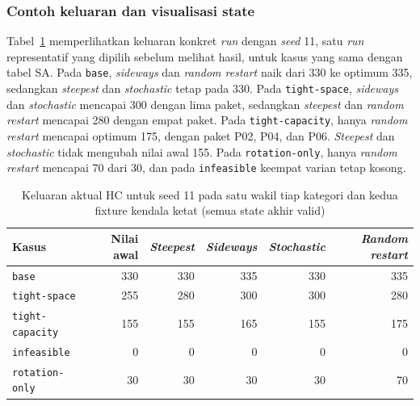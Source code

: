 \subsubsection{Contoh keluaran dan visualisasi state}

Tabel~\ref{tab:hc-representative} memperlihatkan keluaran konkret \textit{run} dengan \textit{seed} 11, satu \textit{run} representatif yang dipilih sebelum melihat hasil, untuk kasus yang sama dengan tabel SA. Pada \texttt{base}, \textit{sideways} dan \textit{random restart} naik dari 330 ke optimum 335, sedangkan \textit{steepest} dan \textit{stochastic} tetap pada 330. Pada \texttt{tight-space}, \textit{sideways} dan \textit{stochastic} mencapai 300 dengan lima paket, sedangkan \textit{steepest} dan \textit{random restart} mencapai 280 dengan empat paket. Pada \texttt{tight-capacity}, hanya \textit{random restart} mencapai optimum 175, dengan paket P02, P04, dan P06. \textit{Steepest} dan \textit{stochastic} tidak mengubah nilai awal 155. Pada \texttt{rotation-only}, hanya \textit{random restart} mencapai 70 dari 30, dan pada \texttt{infeasible} keempat varian tetap kosong.

\begin{table}[H]
    \centering
    \small
    \caption{Keluaran aktual HC untuk seed 11 pada satu wakil tiap kategori dan kedua fixture kendala ketat (semua state akhir valid)}
    \label{tab:hc-representative}
    \begin{tabular}{@{}lrrrrr@{}}
        \toprule
        Kasus                   & Nilai awal & \textit{Steepest} & \textit{Sideways} & \textit{Stochastic} & \textit{Random restart} \\
        \midrule
        \texttt{base}           & 330        & 330               & 335               & 330                 & 335                     \\
        \texttt{tight-space}    & 255        & 280               & 300               & 300                 & 280                     \\
        \texttt{tight-capacity} & 155        & 155               & 165               & 155                 & 175                     \\
        \texttt{infeasible}     & 0          & 0                 & 0                 & 0                   & 0                       \\
        \texttt{rotation-only}  & 30         & 30                & 30                & 30                  & 70                      \\
        \bottomrule
    \end{tabular}
\end{table}


